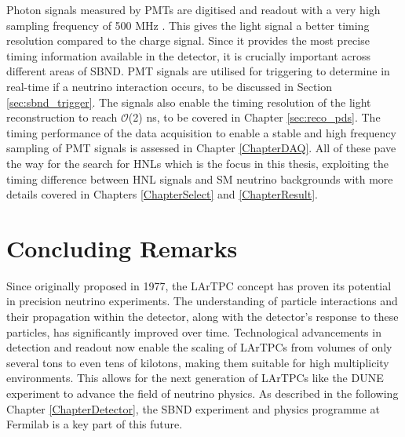 Photon signals measured by PMTs are digitised and readout with a very high sampling frequency of 500 MHz \cite{sbnd_det}.
This gives the light signal a better timing resolution compared to the charge signal.
Since it provides the most precise timing information available in the detector, it is crucially important across different areas of SBND.
PMT signals are utilised for triggering to determine in real-time if a neutrino interaction occurs, to be discussed in Section \ref{sec:sbnd_trigger}.
The signals also enable the timing resolution of the light reconstruction to reach $\mathcal{O}$(2) ns, to be covered in Chapter \ref{sec:reco_pds}.
The timing performance of the data acquisition to enable a stable and high frequency sampling of PMT signals is assessed in Chapter \ref{ChapterDAQ}.
All of these pave the way for the search for HNLs which is the focus in this thesis, exploiting the timing difference between HNL signals and SM neutrino backgrounds with more details covered in Chapters \ref{ChapterSelect} and \ref{ChapterResult}.

\section{Concluding Remarks}
\label{lartpcConclude}
Since originally proposed in 1977, the LArTPC concept has proven its potential in precision neutrino experiments.
The understanding of particle interactions and their propagation within the detector, along with the detector's response to these particles, has significantly improved over time. 
Technological advancements in detection and readout now enable the scaling of LArTPCs from volumes of only several tons to even tens of kilotons, making them suitable for high multiplicity environments.
This allows for the next generation of LArTPCs like the DUNE experiment to advance the field of neutrino physics.
As described in the following Chapter \ref{ChapterDetector}, the SBND experiment and physics programme at Fermilab is a key part of this future.

